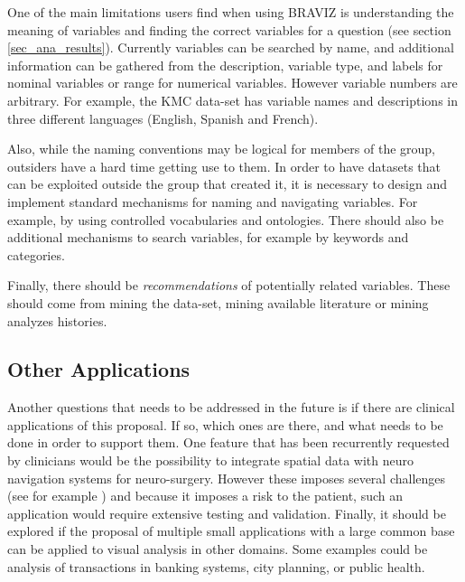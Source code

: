 One of the main limitations users find when using BRAVIZ is understanding the meaning of variables and finding the correct variables for a question (see section \ref{sec_ana_results}). Currently variables can be searched by name, and additional information can be gathered from the description, variable type, and labels for nominal variables or range for numerical variables. However variable numbers are arbitrary. For example, the KMC data-set has variable names and descriptions in three different languages (English, Spanish and French). 

Also, while the naming conventions may be logical for members of the group, outsiders have a hard time getting use to them. In order to have datasets that can be exploited outside the group  that created it, it is necessary to design and implement standard mechanisms for naming and navigating variables. For example, by using controlled vocabularies and ontologies. There should also be additional mechanisms to search variables, for example by keywords and categories.

Finally, there should be \emph{recommendations} of potentially related variables. These should come from mining the data-set, mining available literature or mining analyzes histories.

\subsection{Other Applications}

Another questions that needs to be addressed in the future is if there are clinical applications of this proposal. If so, which ones are there, and what needs to be done in order to support them. One feature that has been recurrently requested by clinicians would be the possibility to integrate spatial data with neuro navigation systems for neuro-surgery. However these imposes several challenges (see for example \autocite{talos_diffusion_2003}) and because it imposes a  risk to the patient, such an application would require extensive testing and validation.
Finally, it should be explored if the proposal of multiple small applications with a large common base can be applied to visual analysis in other domains. Some examples could be analysis of transactions in banking systems, city planning, or public health.  